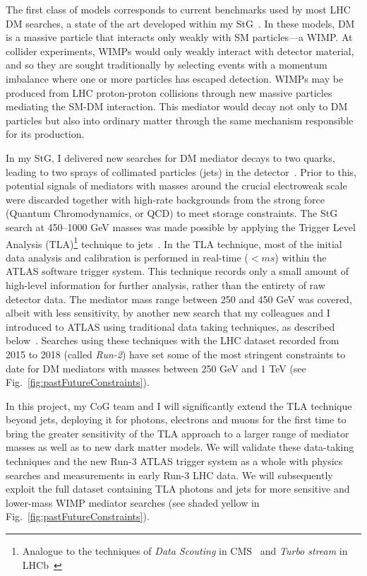 \documentclass[11pt,a4paper]{article}
\begin{document}
The first class of models corresponds to current benchmarks used by most LHC DM searches, a state of the art developed within my StG~\cite{Abercrombie:2015wmb,Boveia:2018yeb}. 
In these models, DM is a massive particle that interacts only weakly with SM particles---a WIMP. %
At collider experiments, WIMPs would only weakly interact with detector material, and so they are sought traditionally by selecting events with a momentum imbalance where one or more particles has escaped detection.
WIMPs may be produced from LHC proton-proton collisions through new massive particles mediating the SM-DM interaction.
This mediator would decay not only to DM particles but also into ordinary matter through the same mechanism responsible for its production.

In my StG, I delivered new searches for DM mediator decays to two quarks, leading to two sprays of collimated particles (jets) in the detector~\cite{Aaboud:2018fzt,Aaboud:2019zxd,ATLAS:2015nsi}. 
Prior to this, potential signals of mediators with masses around the crucial electroweak scale were discarded together with high-rate backgrounds from the strong force (Quantum Chromodynamics, or QCD) to meet storage constraints.
The StG search at 450--1000 GeV masses was made possible by applying the Trigger Level Analysis (TLA)\footnote{Analogue to the techniques of \textit{Data Scouting} in CMS~\cite{Khachatryan:2016ecr} and \textit{Turbo stream} in LHCb~\cite{Aaij:2016rxn}} technique to jets~\cite{Aaboud:2018fzt}. 
In the TLA technique, most of the initial data analysis and calibration is performed in real-time ($< ms$) within the ATLAS software trigger system.%
This technique records only a small amount of high-level information for further analysis, rather than the entirety of raw detector data. 
The mediator mass range between 250 and 450 GeV was covered, albeit with less sensitivity, by another new search that my colleagues and I introduced to ATLAS using traditional data taking techniques, as described below~\cite{Aaboud:2019zxd}. 
Searches using these techniques with the LHC dataset recorded from 2015 to 2018 (called \textit{Run-2}) have set some of the most stringent constraints to date for DM mediators with masses between 250 GeV and 1 TeV (see Fig.~\ref{fig:pastFutureConstraints}). 

In this project, my CoG team and I will significantly extend the TLA technique beyond jets, deploying it for photons, electrons and muons for the first time to bring the greater sensitivity of the TLA approach to a larger range of mediator masses as well as to new dark matter models. 
We will validate these data-taking techniques and the new Run-3 ATLAS trigger system as a whole with physics searches and measurements in early Run-3 LHC data. 
We will subsequently exploit the full dataset containing TLA photons and jets for more sensitive and lower-mass WIMP mediator searches (see shaded yellow in Fig.~\ref{fig:pastFutureConstraints}). 
\end{document}
